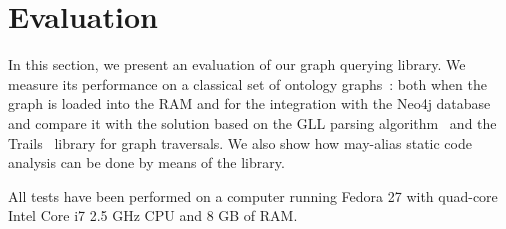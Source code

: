 \section{Evaluation}
\label{sec:evaluation}

In this section, we present an evaluation of our graph querying library.
We measure its performance on a classical set of ontology graphs~\cite{CFGonRDF}: both when the graph is loaded into the RAM and for the integration with the Neo4j database and compare it with the solution based on the GLL parsing algorithm~\cite{GrigorevR16} and the Trails~\cite{ScalaGraphParsing} library for graph traversals. We also show how may-alias static code analysis can be done by means of the library.

All tests have been performed on a computer running Fedora 27 with quad-core Intel Core i7 2.5 GHz CPU and 8 GB of RAM.

